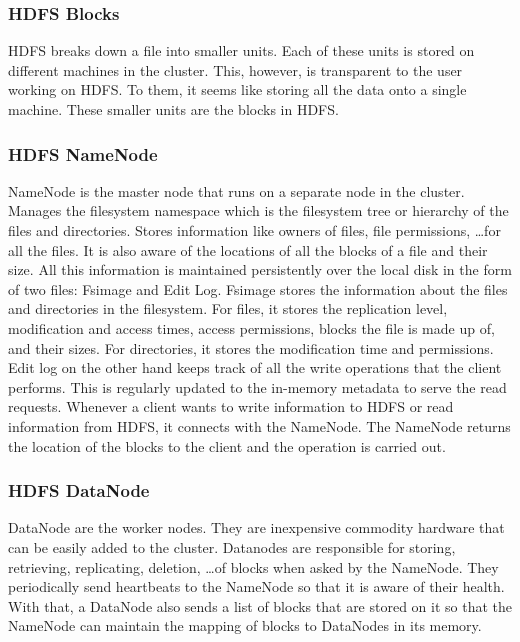 \documentclass[\main/main.tex]{subfiles}
\begin{document}
\subsubsection{HDFS Blocks} 
HDFS breaks down a file into smaller units. Each of these units is stored on different machines in the cluster. This, however, is transparent to the user working on HDFS. To them, it seems like storing all the data onto a single machine. These smaller units are the blocks in HDFS.
\subsubsection{HDFS NameNode}
NameNode is the master node that runs on a separate node in the cluster.
Manages the filesystem namespace which is the filesystem tree or hierarchy of the files and directories.
Stores information like owners of files, file permissions, \dots for all the files.
It is also aware of the locations of all the blocks of a file and their size.
All this information is maintained persistently over the local disk in the form of two files: Fsimage and Edit Log.
Fsimage stores the information about the files and directories in the filesystem. For files, it stores the replication level, modification and access times, access permissions, blocks the file is made up of, and their sizes. For directories, it stores the modification time and permissions.
Edit log on the other hand keeps track of all the write operations that the client performs. This is regularly updated to the in-memory metadata to serve the read requests.
Whenever a client wants to write information to HDFS or read information from HDFS, it connects with the NameNode. The NameNode returns the location of the blocks to the client and the operation is carried out.
\subsubsection{HDFS DataNode}
DataNode are the worker nodes. They are inexpensive commodity hardware that can be easily added to the cluster. Datanodes are responsible for storing, retrieving, replicating, deletion, \dots of blocks when asked by the NameNode. They periodically send heartbeats to the NameNode so that it is aware of their health. With that, a DataNode also sends a list of blocks that are stored on it so that the NameNode can maintain the mapping of blocks to DataNodes in its memory.
\end{document}

